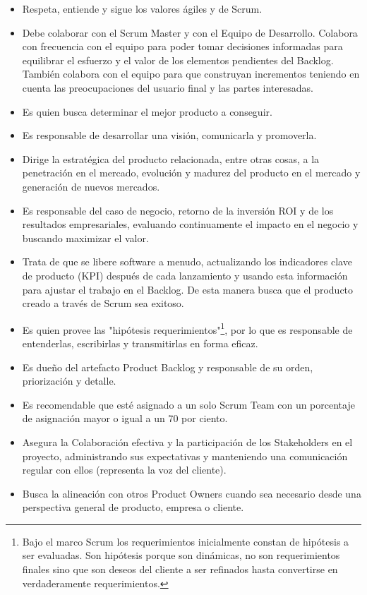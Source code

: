 \begin{itemize}
\item Respeta, entiende y sigue los valores ágiles y de Scrum.
\item Debe colaborar con el Scrum Master y con el Equipo de Desarrollo. Colabora con frecuencia con el equipo para poder tomar decisiones informadas para equilibrar el esfuerzo y el valor de los elementos pendientes del Backlog. También colabora con el equipo para que construyan incrementos teniendo en cuenta las preocupaciones del usuario final y las partes interesadas.
\item Es quien busca determinar el mejor producto a conseguir.
\item Es responsable de desarrollar una visión, comunicarla y promoverla.
\item Dirige la estratégica del producto relacionada, entre otras cosas, a la penetración en el mercado, evolución y madurez del producto en el mercado y generación de nuevos mercados.
\item Es responsable del caso de negocio, retorno de la inversión ROI y de los resultados empresariales, evaluando continuamente el impacto en el negocio y buscando maximizar el valor.
\item Trata de que se libere software a menudo, actualizando los indicadores clave de producto (KPI) después de cada lanzamiento y usando esta información para ajustar el trabajo en el Backlog. De esta manera busca que el producto creado a través de Scrum sea exitoso.
\item Es quien provee las "hipótesis requerimientos"\footnote{Bajo el marco Scrum los requerimientos inicialmente constan de hipótesis a ser evaluadas. Son hipótesis porque son dinámicas, no son requerimientos finales sino que son deseos del cliente a ser refinados hasta convertirse en verdaderamente requerimientos.}, por lo que es responsable de entenderlas, escribirlas y transmitirlas en forma eficaz.
\item Es dueño del artefacto Product Backlog y responsable de su orden, priorización y detalle.
\item Es recomendable que esté asignado a un solo Scrum Team con un porcentaje de asignación mayor o igual a un 70 por ciento.
\item Asegura la Colaboración efectiva y la participación de los Stakeholders en el proyecto, administrando sus expectativas y manteniendo una comunicación regular con ellos (representa la voz del cliente).
\item Busca la alineación con otros Product Owners cuando sea necesario desde una perspectiva general de producto, empresa o cliente.

\end{itemize}
